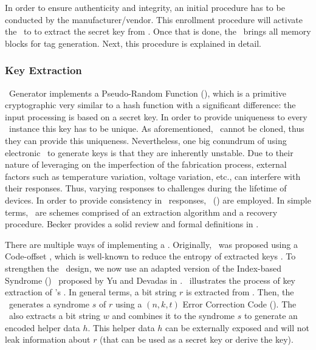 In order to ensure authenticity and integrity, an initial procedure has to be conducted by the manufacturer\slash{}vendor. This enrollment procedure will activate the \fuzzy~to to extract the secret key from \pufs. Once that is done, the \handler~brings all memory blocks for tag generation. Next, this procedure is explained in detail.

\subsubsection{Key Extraction}
\label{subsubsec:Key-Extraction}

\ptag~Generator implements a Pseudo-Random Function (\prf), which is a primitive cryptographic very similar to a hash function with a significant difference: the input processing is based on a secret key. In order to provide uniqueness to every \cshia~instance this key has to be unique. As aforementioned, \pufs~cannot be cloned, thus they can provide this uniqueness. Nevertheless, one big conundrum of using electronic \pufs~to generate keys is that they are inherently unstable. Due to their nature of leveraging on the imperfection of the fabrication process, external factors such as temperature variation, voltage variation, etc., can interfere with their responses. Thus, varying responses to challenges during the lifetime of devices. In order to provide consistency in \puf~responses, \fuzzy~(\fe) are employed. In simple terms, \fes~are schemes comprised of an extraction algorithm and a recovery procedure. Becker provides a solid review and formal definitions in \cite{Becker2017:RobustFuzzyExtractor}.

There are multiple ways of implementing a \fuzzy. Originally, \cshia~was proposed using a Code-offset \fe, which is well-known to reduce the entropy of extracted keys \cite{Armknecht2011:Formalization}. To strengthen the \cshia~design, we now use an adapted version of the Index-based Syndrome (\ibs) \fe~proposed by Yu and Devadas in \cite{Yu2010:RobustErrorCorrection}. \fenroll~illustrates the process of key extraction of \cshia's \fe. In general terms, a bit string $r$ is extracted from \pufs. Then, the \fe~generates a syndrome $s$ of $r$ using a $(n,k,t)$ Error Correction Code (\ecc). The \fe~also extracts a bit string $w$ and combines it to the syndrome $s$ to generate an encoded helper data $h$. This helper data $h$ can be externally exposed and will not leak information about $r$ (that can be used as a secret key or derive the key).


